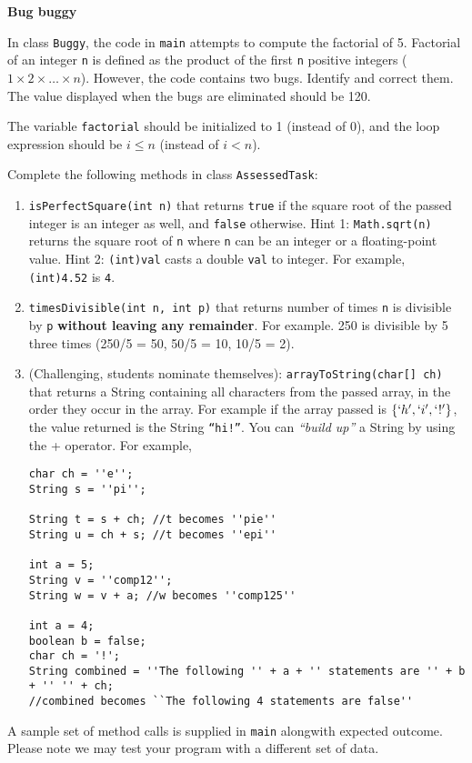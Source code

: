 \begin{questions}
\question \textbf{Bug buggy}

In class \texttt{Buggy}, the code in \texttt{main} attempts to compute the factorial of 5. Factorial of an integer \texttt{n} is defined as the product of the first \texttt{n} positive integers ($1 \times 2 \times \ldots \times n$). However, the code contains two bugs. Identify and correct them. The value displayed when the bugs are eliminated should be 120.

\begin{solution}
The variable \texttt{factorial} should be initialized to 1 (instead of 0), and the loop expression should be $i \leq n$ (instead of $i < n$).
\end{solution}

\newpage

\question Complete the following methods in class \texttt{AssessedTask}:

\begin{enumerate}
\item \texttt{isPerfectSquare(int n)} that returns \texttt{true} if the square root of the passed integer is an integer as well, and \texttt{false} otherwise. Hint 1: \texttt{Math.sqrt(n)} returns the square root of \texttt{n} where \texttt{n} can be an integer or a floating-point value. Hint 2: \texttt{(int)val} casts a double \texttt{val} to integer. For example, \texttt{(int)4.52} is \texttt{4}.
\item \texttt{timesDivisible(int n, int p)} that returns number of times \texttt{n} is divisible by \texttt{p} \textbf{without leaving any remainder}. For example. 250 is divisible by  5 three times (250/5 = 50, 50/5 = 10, 10/5 = 2).
\item (Challenging, students nominate themselves): \texttt{arrayToString(char[] ch)} that returns a String containing all characters from the passed array, in the order they occur in the array. For example if the array passed is $\{`h', `i', `!'\}$, the value returned is the String \texttt{``hi!''}. You can \emph{``build up''} a String by using the + operator. For example,

\vskip 0.5cm

\begin{lstlisting}
char ch = ''e'';
String s = ''pi'';

String t = s + ch; //t becomes ''pie''
String u = ch + s; //t becomes ''epi''

int a = 5;
String v = ''comp12'';
String w = v + a; //w becomes ''comp125''

int a = 4;
boolean b = false;
char ch = '!';
String combined = ''The following '' + a + '' statements are '' + b + '' '' + ch;
//combined becomes ``The following 4 statements are false''
\end{lstlisting}
\end{enumerate}

\vskip 0.5cm

A sample set of method calls is supplied in \texttt{main} alongwith expected outcome. Please note we may test your program with a different set of data.
\end{questions}

